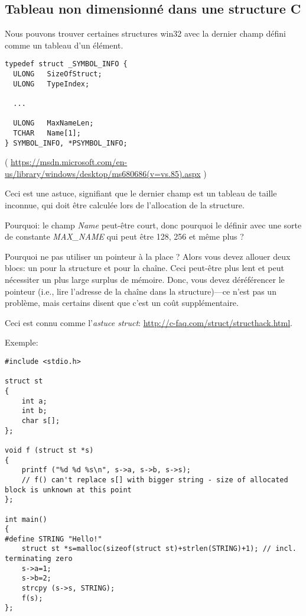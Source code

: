 \subsection{Tableau non dimensionné dans une structure C}

Nous pouvons trouver certaines structures win32 avec la dernier champ défini comme
un tableau d'un élément.

\begin{lstlisting}[style=customc]
typedef struct _SYMBOL_INFO {
  ULONG   SizeOfStruct;
  ULONG   TypeIndex;
  
  ...

  ULONG   MaxNameLen;
  TCHAR   Name[1];
} SYMBOL_INFO, *PSYMBOL_INFO;
\end{lstlisting}

( \url{https://msdn.microsoft.com/en-us/library/windows/desktop/ms680686(v=vs.85).aspx} )

Ceci est une astuce, signifiant que le dernier champ est un tableau de taille inconnue,
qui doit être calculée lors de l'allocation de la structure.

Pourquoi: le champ \emph{Name} peut-être court, donc pourquoi le définir avec une sorte
de constante \emph{MAX\_NAME} qui peut être 128, 256 et même plus ?

Pourquoi ne pas utiliser un pointeur à la place ? Alors vous devez allouer deux blocs:
un pour la structure et  pour la chaîne.
Ceci peut-être plus lent et peut nécessiter un plus large surplus de mémoire.
Donc, vous devez déréférencer le pointeur (i.e., lire l'adresse de la chaîne dans
la structure)---ce n'est pas un problème, mais certains disent que c'est un coût supplémentaire.

Ceci est connu comme l'\emph{astuce struct}: \url{http://c-faq.com/struct/structhack.html}.

Exemple:

\begin{lstlisting}[style=customc]
#include <stdio.h>

struct st
{
	int a;
	int b;
	char s[];
};

void f (struct st *s)
{
	printf ("%d %d %s\n", s->a, s->b, s->s);
	// f() can't replace s[] with bigger string - size of allocated block is unknown at this point
};

int main()
{
#define STRING "Hello!"
	struct st *s=malloc(sizeof(struct st)+strlen(STRING)+1); // incl. terminating zero
	s->a=1;
	s->b=2;
	strcpy (s->s, STRING);
	f(s);
};
\end{lstlisting}

